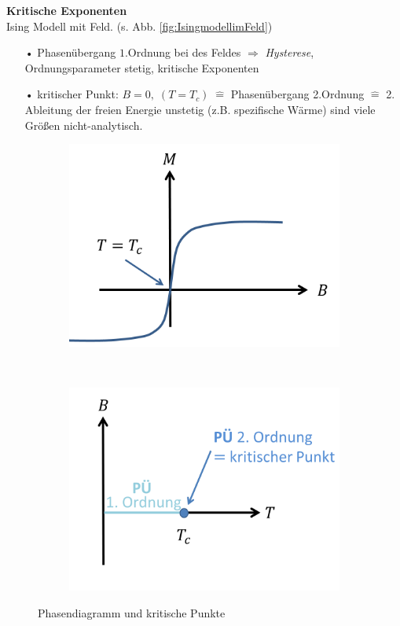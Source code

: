 \documentclass[12pt]{article}
\begin{document}
\textbf{Kritische Exponenten} \\
Ising Modell mit Feld. (s. Abb. \ref{fig:IsingmodellimFeld})
\begin{itemize}
\item[•] Phasenübergang $1.$Ordnung bei %
des Feldes $\Rightarrow$ \textit{Hysterese}, Ordnungsparameter stetig, kritische Exponenten

\item[•] kritischer Punkt: $B=0, \; (T= T_c) \;  \widehat{=}$ Phasenübergang 2.Ordnung $\widehat{=} $ 2. Ableitung der freien Energie unstetig (z.B. spezifische Wärme) %
sind viele Größen nicht-analytisch. 
\end{itemize}
\begin{figure}[h] 
		\begin{subfigure}[h]{0.5 \textwidth}
		\centering
		\includegraphics[width=\textwidth]{Folie37.png}
		\caption{} 
		\centering
	\end{subfigure}
	~
\begin{subfigure}[h]{0.5\textwidth}
		\centering
		\includegraphics[width=\textwidth]{Folie38.png}
		\caption{}
		\centering
	\end{subfigure}
	\caption{ Phasendiagramm und kritische Punkte} \label{Phasendiagramm}
\end{figure}	
\end{document}
